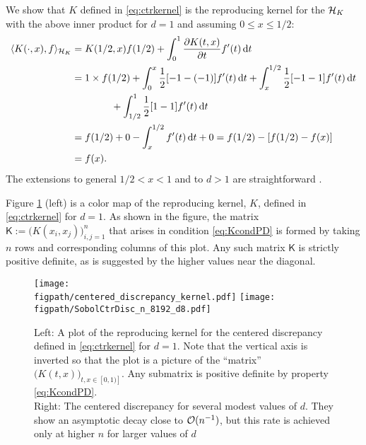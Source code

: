 \documentclass{svproc}
\newcommand{\figpath}{Figures}
\begin{document}
We show that $K$ defined in \eqref{eq:ctrkernel} is the reproducing kernel for the ${\mathcal{H}}_K$ with the above inner product for $d=1$ and assuming $0 \le x \le 1/2$:
\begin{align*}
	\langle K(\cdot,x), f \rangle_{{\mathcal{H}}_K}
	& =
	K(1/2,x) f(1/2) + \int_0^1 \frac{\partial K(t,x)}{\partial t} f'(t) \, \mathrm{d} t \\
	& = 1 \times f(1/2) +  \int_0^x \frac 12 [-1  - (-1) ] f'(t) \, \mathrm{d} t +
	\int_x^{1/2} \frac 12 [-1  - 1 ] f'(t) \, \mathrm{d} t \\
	& \qquad \qquad +
	\int_{1/2}^{1} \frac 12 [1  - 1 ] f'(t) \, \mathrm{d} t \\
	& = f(1/2) + 0 - \int_x^{1/2} f'(t) \, \mathrm{d} t + 0 = f(1/2) - [f(1/2) - f(x)] \\
	& =  f(x).
\end{align*}
The extensions to general $1/2 < x < 1$ and to $d > 1$ are straightforward \cite{Hic97a}.

Figure \ref{fig:ctrKer} (left) is a color map of the reproducing kernel, $K$, defined in \eqref{eq:ctrkernel} for $d=1$.  As shown in the figure, the matrix $\mathsf{K} := \bigl( K(x_i,x_j) \bigr)_{i,j=1}^n$ that arises in condition \eqref{eq:KcondPD} is formed by taking $n$ rows and corresponding columns of this plot.  Any such matrix $\mathsf{K}$ is strictly positive definite, as is suggested by the higher values near the diagonal.

\begin{figure}
	\centering
	\texttt{[image: \\figpath/centered\_discrepancy\_kernel.pdf]} \quad 
    \texttt{[image: \\figpath/SobolCtrDisc\_n\_8192\_d8.pdf]}
	\caption{Left:  A plot of the reproducing kernel for the centered discrepancy defined in \eqref{eq:ctrkernel} for $d=1$.  Note that the vertical axis is inverted so that the plot is a picture of the ``matrix'' $\bigl( K(t,x) \bigr)_{t,x \in [0,1)]}$.  Any submatrix is positive definite by property \eqref{eq:KcondPD}. \\
    Right: The centered discrepancy for several modest values of $d$.  They show an asymptotic decay close to ${\mathcal{O}}(n^{-1})$, but this rate is achieved only at higher $n$ for larger values of $d$ \label{fig:ctrKer}}
\end{figure}
\end{document}
